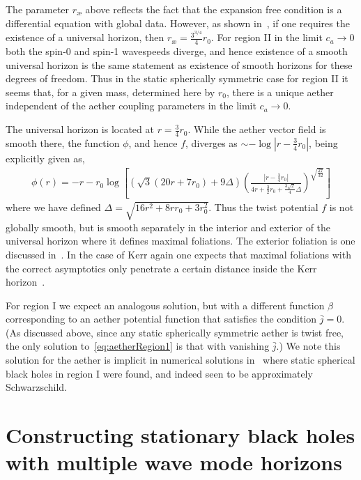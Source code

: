 \documentclass[12pt]{article}
\numberwithin{equation}{section}
\begin{document}
The parameter $r_{\text{\ae}}$ above reflects the fact that the expansion free condition is a differential equation with global data. However, as shown in~\cite{Berglund:2012bu}, if one requires the existence of a universal horizon, then $r_{\text{\ae}} = \frac{3^{3/4}}{4} r_0$.
For region II in the limit $c_a \to 0$ both the spin-0 and spin-1 wavespeeds diverge, and hence existence of a smooth universal horizon is the same statement as existence of 
smooth horizons for these degrees of freedom.
Thus in the static spherically symmetric case for region II it seems that, for a given mass, determined here by $r_0$, there is a unique aether independent of the aether coupling
parameters 
in the limit $c_a \to 0$.


The universal horizon is located at $r = \frac{3}{4} r_0$.
While the aether vector field is smooth there,
the function $\phi$, and hence $f$, diverges as $\sim -\log|r- \frac34 r_0|$, being explicitly given as,
\begin{eqnarray}
\phi(r) = -r - r_0 \log\left[ \left( \sqrt{3} ( 20 r + 7 r_0) + 9 \Delta \right) \left( \frac{\left| r - \frac{3}{4} r_0 \right|}{4 r + \frac{3}{2} r_0 + \frac{3 \sqrt{2}}{4} \Delta} \right)^{\sqrt{\frac{27}{32}}} \right] 
\end{eqnarray}
where we have defined $\Delta = \sqrt{16 r^2 + 8 r r_0 + 3 r_0^2}$.
Thus the twist potential $f$ is not globally smooth, but is smooth separately in the interior and exterior of the universal horizon where it defines maximal foliations. The exterior foliation is one discussed in~\cite{Estabrook:1973ue,Beig:1997fp}. 
In the case of Kerr again one expects that maximal foliations with the correct asymptotics  only penetrate a certain distance inside the Kerr horizon~\cite{PhysRevD.31.1267}.


For region I we expect an analogous solution, but with a different function $\beta$ corresponding to an aether potential function that satisfies the condition $\bar{j} = 0$. (As discussed above, since any static spherically symmetric aether is twist free, the only solution to~\eqref{eq:aetherRegion1} is that with vanishing $\bar{j}$.) 
We note this solution for the aether is implicit in numerical solutions in~\cite{Zhang:2020too} where static spherical black holes in region I were found, and indeed seen to be approximately Schwarzschild.



 
\section{Constructing stationary black holes with multiple wave mode horizons}
\label{sec:numericalconstruction} 
\end{document}
